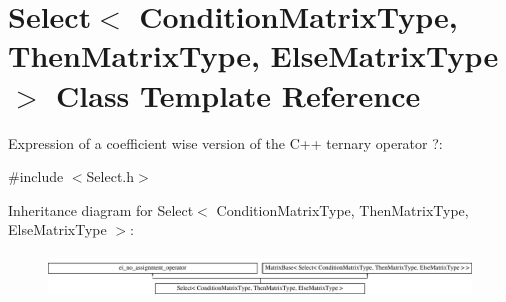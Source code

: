 \hypertarget{class_select}{\section{Select$<$ Condition\-Matrix\-Type, Then\-Matrix\-Type, Else\-Matrix\-Type $>$ Class Template Reference}
\label{class_select}
}


Expression of a coefficient wise version of the C++ ternary operator ?\-:  




{\ttfamily \#include $<$Select.\-h$>$}

Inheritance diagram for Select$<$ Condition\-Matrix\-Type, Then\-Matrix\-Type, Else\-Matrix\-Type $>$\-:\begin{figure}[H]
\begin{center}
\leavevmode
\includegraphics[height=1.171548cm]{class_select}
\end{center}
\end{figure}
